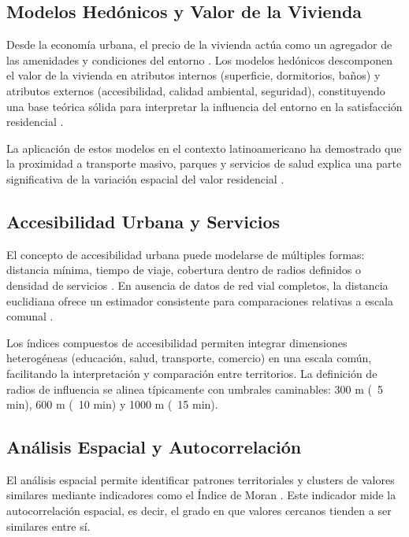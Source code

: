 \documentclass[11pt,letterpaper]{article}
\begin{document}
\subsection{Modelos Hedónicos y Valor de la Vivienda}

Desde la economía urbana, el precio de la vivienda actúa como un agregador de las amenidades y condiciones del entorno \cite{rosen1974,lancaster1966}. Los modelos hedónicos descomponen el valor de la vivienda en atributos internos (superficie, dormitorios, baños) y atributos externos (accesibilidad, calidad ambiental, seguridad), constituyendo una base teórica sólida para interpretar la influencia del entorno en la satisfacción residencial \cite{freeman2003,brueckner2011}.

La aplicación de estos modelos en el contexto latinoamericano ha demostrado que la proximidad a transporte masivo, parques y servicios de salud explica una parte significativa de la variación espacial del valor residencial \cite{alvarez2021,zhang2019}.

\subsection{Accesibilidad Urbana y Servicios}

El concepto de accesibilidad urbana puede modelarse de múltiples formas: distancia mínima, tiempo de viaje, cobertura dentro de radios definidos o densidad de servicios \cite{geurs2004,handy1997}. En ausencia de datos de red vial completos, la distancia euclidiana ofrece un estimador consistente para comparaciones relativas a escala comunal \cite{talen2003,wei2018}.

Los índices compuestos de accesibilidad permiten integrar dimensiones heterogéneas (educación, salud, transporte, comercio) en una escala común, facilitando la interpretación y comparación entre territorios. La definición de radios de influencia se alinea típicamente con umbrales caminables: 300 m (~5 min), 600 m (~10 min) y 1000 m (~15 min).

\subsection{Análisis Espacial y Autocorrelación}

El análisis espacial permite identificar patrones territoriales y clusters de valores similares mediante indicadores como el Índice de Moran \cite{anselin1995}. Este indicador mide la autocorrelación espacial, es decir, el grado en que valores cercanos tienden a ser similares entre sí.
\end{document}

